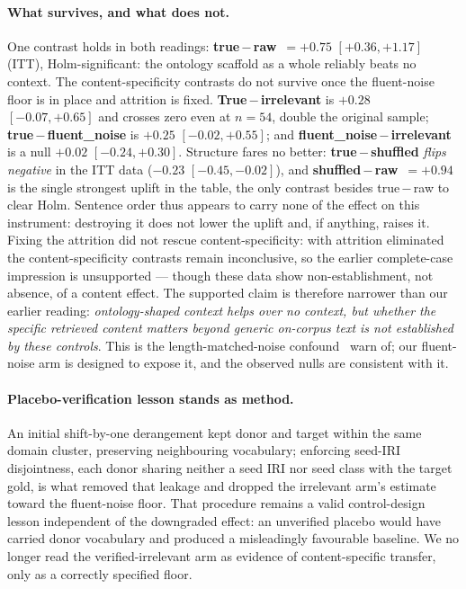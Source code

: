 \documentclass[10pt,twocolumn]{article}
\begin{document}
\paragraph{What survives, and what does not.} One contrast holds in both readings: \textbf{true\,$-$\,raw}~$=+0.75$ $[+0.36,+1.17]$ (ITT), Holm-significant: the ontology scaffold as a whole reliably beats no context. The content-specificity contrasts do not survive once the fluent-noise floor is in place and attrition is fixed. \textbf{True\,$-$\,irrelevant} is $+0.28$ $[-0.07,+0.65]$ and crosses zero even at $n=54$, double the original sample; \textbf{true\,$-$\,fluent\_noise} is $+0.25$ $[-0.02,+0.55]$; and \textbf{fluent\_noise\,$-$\,irrelevant} is a null $+0.02$ $[-0.24,+0.30]$. Structure fares no better: \textbf{true\,$-$\,shuffled} \emph{flips negative} in the ITT data ($-0.23$ $[-0.45,-0.02]$), and \textbf{shuffled\,$-$\,raw}~$=+0.94$ is the single strongest uplift in the table, the only contrast besides true\,$-$\,raw to clear Holm. Sentence order thus appears to carry none of the effect on this instrument: destroying it does not lower the uplift and, if anything, raises it. Fixing the attrition did not rescue content-specificity: with attrition eliminated the content-specificity contrasts remain inconclusive, so the earlier complete-case impression is unsupported --- though these data show non-establishment, not absence, of a content effect. The supported claim is therefore narrower than our earlier reading: \emph{ontology-shaped context helps over no context, but whether the specific retrieved content matters beyond generic on-corpus text is not established by these controls}. This is the length-matched-noise confound~\textcite{cuconasu2024poweofnoise} warn of; our fluent-noise arm is designed to expose it, and the observed nulls are consistent with it.

\paragraph{Placebo-verification lesson stands as method.} An initial shift-by-one derangement kept donor and target within the same domain cluster, preserving neighbouring vocabulary; enforcing seed-IRI disjointness, each donor sharing neither a seed IRI nor seed class with the target gold, is what removed that leakage and dropped the irrelevant arm's estimate toward the fluent-noise floor. That procedure remains a valid control-design lesson independent of the downgraded effect: an unverified placebo would have carried donor vocabulary and produced a misleadingly favourable baseline. We no longer read the verified-irrelevant arm as evidence of content-specific transfer, only as a correctly specified floor.
\end{document}
